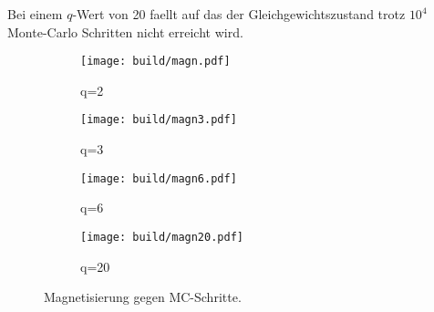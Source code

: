 \documentclass{scrartcl}
\begin{document}
Bei einem $q$-Wert von 20 faellt auf das der Gleichgewichtszustand trotz $10^4$
Monte-Carlo Schritten nicht erreicht wird.
\begin{figure}[ht]
		\centering
		\begin{subfigure}[b]{0.49\textwidth}
				\begin{center}
						\texttt{[image: build/magn.pdf]}
				\end{center}
				\caption{q=2}
		\end{subfigure}
		\begin{subfigure}[b]{0.49\textwidth}
				\begin{center}
						\texttt{[image: build/magn3.pdf]}
				\end{center}
				\caption{q=3}
		\end{subfigure}
		\begin{subfigure}[b]{0.49\textwidth}
				\begin{center}
						\texttt{[image: build/magn6.pdf]}
				\end{center}
				\caption{q=6}
		\end{subfigure}
		\begin{subfigure}[b]{0.49\textwidth}
				\begin{center}
						\texttt{[image: build/magn20.pdf]}
				\end{center}
				\caption{q=20}
		\end{subfigure}
		\caption{Magnetisierung gegen MC-Schritte.}%
		\label{fig:1}
\end{figure}
\end{document}
